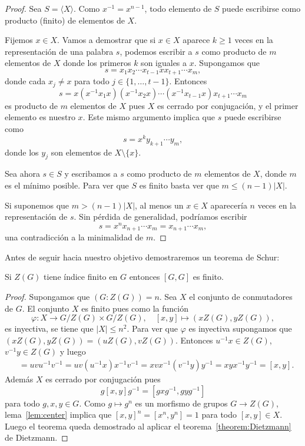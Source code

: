 \begin{proof}
	Sea $S=\langle X\rangle$. Como $x^{-1}=x^{n-1}$, todo elemento de $S$ puede
	escribirse como producto (finito) de elementos de $X$. 
	
	Fijemos $x\in X$. Vamos a demostrar que si $x\in X$ aparece $k\geq 1$ veces
	en la representación de una palabra $s$, podemos escribir a $s$ como producto de $m$
	elementos de $X$ donde los primeros $k$ son iguales a $x$.  Supongamos que
	\[
	s=x_1x_2\cdots x_{t-1}xx_{t+1}\cdots x_m,
	\]
	donde cada $x_j\ne x$ para todo $j\in\{1,\dots,t-1\}$. Entonces
	\[
		s=x(x^{-1}x_1x)(x^{-1}x_2x)\cdots (x^{-1}x_{t-1}x)x_{t+1}\cdots x_m
	\]
	es producto de $m$ elementos de $X$ pues $X$ es cerrado por conjugación, y
	el primer elemento es nuestro $x$. Este mismo argumento implica que $s$
	puede escribirse como
	\[
		s=x^ky_{k+1}\cdots y_m,
	\]
	donde los $y_j$ son elementos de $X\setminus\{x\}$.

	Sea ahora $s\in S$ y escribamos a $s$ como producto de $m$ elementos de $X$,
	donde $m$ es el mínimo posible.  Para ver que $S$ es finito basta ver que 
	$m\leq (n-1)|X|$. 
	
	Si suponemos que $m>(n-1)|X|$, 
	al menos un $x\in X$ aparecería $n$ veces en la
	representación de $s$. Sin pérdida de generalidad, podríamos escribir 
	\[
		s=x^nx_{n+1}\cdots x_m=x_{n+1}\cdots x_m,
	\]
	una contradicción a la minimalidad de $m$. 
\end{proof}

Antes de seguir hacia nuestro objetivo demostraremos un teorema de Schur:

\begin{theorem}[Schur]
\label{thm:Schur}
	Si $Z(G)$ tiene índice finito en $G$ entonces $[G,G]$ es finito.
\end{theorem}

\begin{proof}
	Supongamos que $(G:Z(G))=n$. 
	Sea $X$ el conjunto de conmutadores de $G$. El conjunto $X$ es finito pues como la función
	\[
		\varphi\colon X\to G/Z(G)\times G/Z(G),\quad [x,y]\mapsto (xZ(G),yZ(G)),
	\]
	es inyectiva, se tiene que $|X|\leq n^2$. Para ver que $\varphi$ es
	inyectiva supongamos que $(xZ(G),yZ(G))=(uZ(G),vZ(G))$. Entonces $u^{-1}x\in Z(G)$, 
	$v^{-1}y\in Z(G)$ y luego 
	\begin{align*}
		[u,v]&=uvu^{-1}v^{-1}=uv(u^{-1}x)x^{-1}v^{-1}=xvx^{-1}(v^{-1}y)y^{-1}=xyx^{-1}y^{-1}=[x,y].
	\end{align*}
	Además $X$ es cerrado por conjugación pues
	\[
		g[x,y]g^{-1}=[gxg^{-1},gyg^{-1}]
	\]
	para todo $g,x,y\in G$. Como $g\mapsto g^n$ es un morfismo de grupos $G\to
	Z(G)$, lema~\ref{lem:center} implica que $[x,y]^n=[x^n,y^n]=1$ para todo
	$[x,y]\in X$.  Luego el teorema queda demostrado al aplicar el
	teorema~\ref{theorem:Dietzmann} de Dietzmann.
\end{proof}


